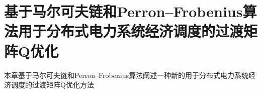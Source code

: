 \chapter{基于马尔可夫链和Perron–Frobenius算法用于分布式电力系统经济调度的过渡矩阵Q优化}
\label{cha:Algorithm}

本章基于马尔可夫链和Perron–Frobenius算法阐述一种新的用于分布式电力系统经济调度的过渡矩阵Q优化方法